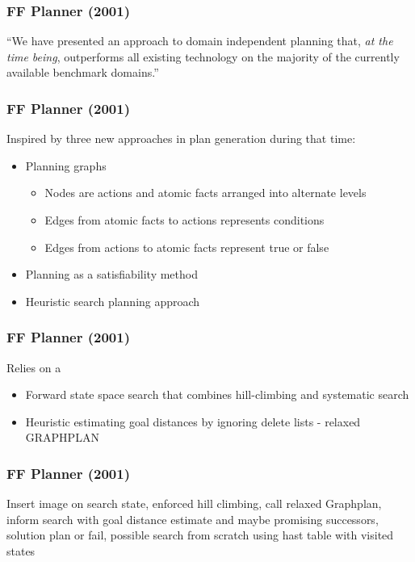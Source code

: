 \documentclass{beamer}
\let\origframetitle=\frametitle
\renewcommand\frametitle[1]{\origframetitle{\textbf{\large{\textrm{#1}}}}}
\begin{document}
\begin{frame}
\begin{columns}
  \end{columns}
\end{frame}

\begin{frame}
  \frametitle{FF Planner (2001)}

  ``We have presented an approach to domain independent planning that, \emph{at
  the time being}, outperforms all existing technology on the majority of the
  currently available benchmark domains.''

\end{frame}

\begin{frame}
  \frametitle{FF Planner (2001)}

  Inspired by three new approaches in plan generation during that time:

  \begin{itemize}
    \item Planning graphs
    \begin{itemize}
      \item Nodes are actions and atomic facts arranged into alternate levels
      \item Edges from atomic facts to actions represents conditions
      \item Edges from actions to atomic facts represent true or false
    \end{itemize}
    \item Planning as a satisfiability method
    \item Heuristic search planning approach
  \end{itemize}
\end{frame}

\begin{frame}
  \frametitle{FF Planner (2001)}

  Relies on a

  \begin{itemize}
    \item Forward state space search that combines hill-climbing and systematic search
    \item Heuristic estimating goal distances by ignoring delete lists - relaxed GRAPHPLAN
  \end{itemize}

\end{frame}

\begin{frame}
  \frametitle{FF Planner (2001)}

  Insert image on search state, enforced hill climbing, call relaxed Graphplan,
  inform search with goal distance estimate and maybe promising successors,
  solution plan or fail, possible search from scratch using hast table with
  visited states

\end{frame}
\end{document}
